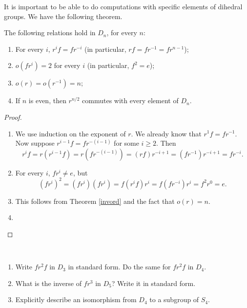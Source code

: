 
It is important to be able to do computations with specific elements of dihedral
 groups. We have the following theorem.

\begin{thm}\label{diords}
The following relations hold in $D_n$, for every $n$:
 \begin{enumerate} %
 \item For every $i$, $r^if=fr^{-i}$ (in particular, $rf=fr^{-1}=fr^{n-1}$);
 \item $o(fr^i)=2$ for every $i$ (in particular, $f^2=e$);
 \item $o(r)=o(r^{-1})=n$;
 \item If $n$ is even, then $r^{n/2}$ commutes with every element of $D_n$.
 \end{enumerate}
\end{thm}

\begin{proof}\
\begin{enumerate}

\item We use induction on the exponent of $r$. We already know that $r^1f=fr^{-1}$.  Now suppose $r^{i-1}f=fr^{-(i-1)}$ for some $i\geq 2$.  Then $$r^if=r(r^{i-1}f)=r(fr^{-(i-1)})=(rf)r^{-i+1}=(fr^{-1})r^{-i+1}=fr^{-i}.$$
\item For every $i$, $fr^i\neq e$, but $$(fr^i)^2=(fr^i)(fr^i)=f(r^if)r^i=f(fr^{-i})r^i=f^2r^0=e.$$
\item This follows from Theorem \ref{invord} and the fact that $o(r)=n$.
\item {} \qedhere
\end{enumerate}
\end{proof}


\begin{example}{}\
\begin{enumerate}
\item Write $fr^2f$ in $D_3$ in standard form.  Do the same for $fr^2f$ in $D_4$.
\item What is the inverse of $fr^3$ in $D_5$?  Write it in standard form.
\item Explicitly describe an isomorphism from $D_4$ to a subgroup of $S_4$. \end{enumerate}
\end{example}


